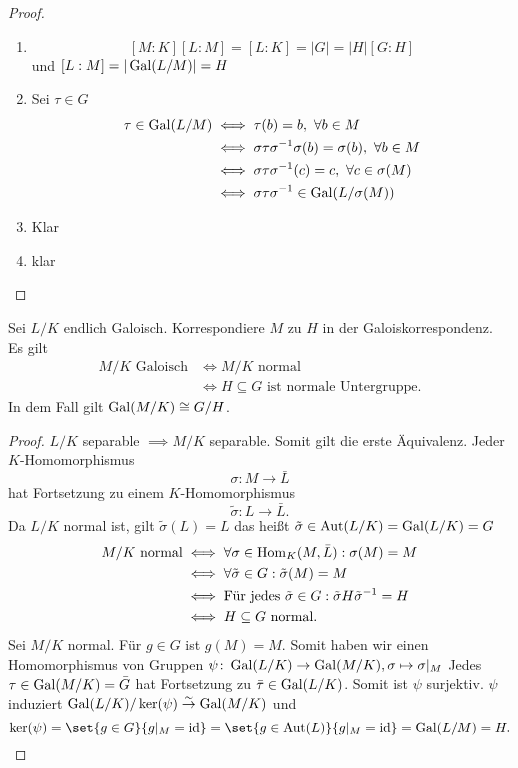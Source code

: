 \begin{Satz}[Galoiskorrespondenz]
\begin{proof}
\begin{enumerate}
        \item \[[M:K][L:M]=[L:K]=|G|=|H|[G:H]\] und \([L:M]=|\operatorname{Gal}(L/M)|=H\)
        \item Sei \(\tau\in G\)
        \begin{align*}
            \tau\in \Gal(L/M)&\iff \tau(b)=b,\ \forall b\in M\\
            &\iff \sigma \tau\sigma^{-1}\sigma(b)=\sigma(b),\ \forall b\in M\\
            &\iff \sigma\tau\sigma^{-1}(c)=c,\ \forall c\in \sigma(M)\\
            & \iff \sigma\tau\sigma^{-1}\in\Gal(L/\sigma(M))
        \end{align*}
        \item Klar
        \item klar
    \end{enumerate}
\end{proof}

\end{Satz}
\begin{Satz}
    Sei \(L/K\) endlich Galoisch. Korrespondiere \(M\) zu \(H\) in der Galoiskorrespondenz.
    Es gilt 
    \begin{align*}
        M/K \text{ Galoisch}&\iff M/K \text{ normal}\\
        & \iff H\subseteq G \text{ ist normale Untergruppe.}
    \end{align*} In dem Fall gilt \(\operatorname{Gal}(M/K)\cong G/H\).
\end{Satz}
\begin{proof}
    \(L/K\) separable \(\implies M/K\) separable. Somit gilt die erste Äquivalenz.
    Jeder \(K\)-Homomorphismus \[\sigma\colon M\to \bar L\] hat Fortsetzung zu einem \(K\)-Homomorphismus \[\tilde\sigma\colon L\to\bar L .\]  Da \(L/K\) normal ist, gilt \(\tilde\sigma(L)=L\) das heißt \(\tilde\sigma\in\operatorname{Aut}(L/K)=\operatorname{Gal}(L/K)=G\)
    \begin{align*}
        M/K \text{ normal}&\iff \forall\sigma\in\operatorname{Hom}_K(M,\bar L): \sigma(M)=M\\
        & \iff \forall\tilde\sigma\in G: \tilde\sigma(M)=M\\
        &\iff \text{Für jedes } \tilde \sigma\in G: \tilde\sigma H\tilde\sigma^{-1}=H\\
        &\iff H\subseteq G \text{ normal.}
    \end{align*}
    Sei \(M/K\) normal. Für \(g\in G\) ist \(g(M)=M\). Somit haben wir einen Homomorphismus von Gruppen 
    \(\psi\colon \operatorname{Gal}(L/K)\to\operatorname{Gal}(M/K), \sigma\mapsto \sigma|_M\)
    Jedes \(\tau\in\operatorname{Gal}(M/K)=\bar G\) hat Fortsetzung zu \(\bar\tau\in\operatorname{Gal}(L/K)\). Somit ist \(\psi\) surjektiv. \(\psi\) induziert \(\operatorname{Gal}(L/K)/\ker(\psi)\stackrel{\sim}{\to}\operatorname{Gal}(M/K)\) und 
    \[\Ker(\psi)=\set{g\in G}{ g|_M=\id}=\set{g\in\Aut(L)}{ g|_M=\id}=\Gal(L/M)=H.\]
\end{proof}
